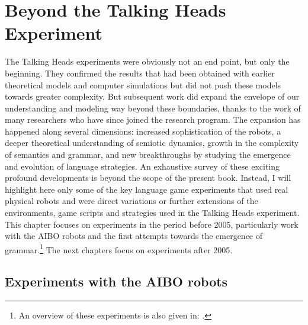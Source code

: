 \chapter{Beyond the Talking Heads Experiment}
\label{c:postscriptum}
\setcounter{foot}{1}

The Talking Heads experiments were obviously not an end point, but only the beginning. They confirmed the results that 
had been obtained with earlier theoretical models and computer simulations but did not push these models 
towards greater complexity. But subsequent work did expand the envelope of our understanding and modeling way  
beyond these boundaries, thanks to the work of many researchers who have since joined the research program. 
The expansion has happened along several dimensions: increased sophistication of the robots, a deeper theoretical 
understanding of semiotic dynamics, growth in the complexity of semantics and grammar, and new breakthroughs by 
studying the emergence and evolution of language strategies. An exhaustive survey of these exciting profound developments 
is beyond the scope of the present book. Instead, I will highlight here only some of the key language game experiments that 
used real physical robots and were direct variations or further extensions of the environments, game scripts
and strategies used in the Talking Heads experiment. This chapter focuses on experiments 
in the period before 2005, particularly work with the AIBO robots and the first attempts towards the emergence 
of grammar.\footnote{An overview of these experiments is also given in: \cite{Steels:2005}.}
The next chapters focus on experiments after 2005. 

\section{Experiments with the AIBO robots} 

